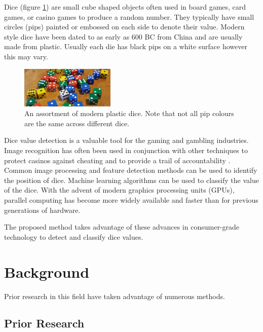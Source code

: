 \documentclass[conference]{IEEEtran}
\begin{document}
Dice (figure \ref{fig:intro}) are small cube shaped objects often used in board games, card games, or casino games to produce a random number.
They typically have small circles (pips) painted or embossed on each side to denote their value.
Modern style dice have been dated to as early as 600 BC from China \cite{Romanowski2020} and are usually made from plastic.
Usually each die has black pips on a white surface however this may vary.
\begin{figure}[H]
	\centering
	\includegraphics[width=0.4\textwidth]{intro}
	\caption{An assortment of modern plastic dice. Note that not all pip colours are the same across different dice.}
	\label{fig:intro}
\end{figure}

Dice value detection is a valuable tool for the gaming and gambling industries.
Image recognition has often been used in conjunction with other techniques to protect casinos against cheating and to provide a trail of accountability \cite{4129523}\cite{Correia1995}.
Common image processing and feature detection methods can be used to identify the position of dice.
Machine learning algorithms can be used to classify the value of the dice.
With the advent of modern graphics processing units (GPUs), parallel computing has become more widely available and faster than for previous generations of hardware.

The proposed method takes advantage of these advances in consumer-grade technology to detect and classify dice values.

\section{Background}


Prior research in this field have taken advantage of numerous methods.

\subsection{Prior Research}
\end{document}
